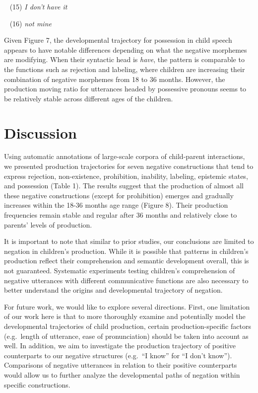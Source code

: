 \documentclass[10pt, letterpaper]{article}
\begin{document}
~ (15) \emph{I don't have it}

~ (16) \emph{not mine}

Given Figure 7, the developmental trajectory for possession in child
speech appears to have notable differences depending on what the
negative morphemes are modifying. When their syntactic head is
\emph{have}, the pattern is comparable to the functions such as
rejection and labeling, where children are increasing their combination
of negative morphemes from 18 to 36 months. However, the production
moving ratio for utterances headed by possessive pronouns seems to be
relatively stable across different ages of the children.

\hypertarget{discussion}{%
\section{Discussion}\label{discussion}}

Using automatic annotations of large-scale corpora of child-parent
interactions, we presented production trajectories for seven negative
constructions that tend to express rejection, non-existence,
prohibition, inability, labeling, epistemic states, and possession
(Table 1). The results suggest that the production of almost all these
negative constructions (except for prohibition) emerges and gradually
increases within the 18-36 months age range (Figure 8). Their production
frequencies remain stable and regular after 36 months and relatively
close to parents' levels of production.

It is important to note that similar to prior studies, our conclusions
are limited to negation in children's production. While it is possible
that patterns in children's production reflect their comprehension and
semantic development overall, this is not guaranteed. Systematic
experiments testing children's comprehension of negative utterances with
different communicative functions are also necessary to better
understand the origins and developmental trajectory of negation.

For future work, we would like to explore several directions. First, one
limitation of our work here is that to more thoroughly examine and
potentially model the developmental trajectories of child production,
certain production-specific factors (e.g.~length of utterance, ease of
pronunciation) should be taken into account as well. In addition, we aim
to investigate the production trajectory of positive counterparts to our
negative structures (e.g.~``I know'' for ``I don't know''). Comparisons
of negative utterances in relation to their positive counterparts would
allow us to further analyze the developmental paths of negation within
specific constructions.
\end{document}
